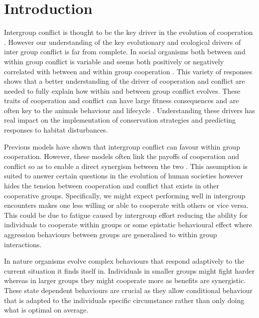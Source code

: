 \section{Introduction}

Intergroup conflict is thought to be the key driver in the evolution of cooperation \citep{radfordWithingroupBehavioural2016,kappelerMindGap2010,barkerWithingroupCompetition2012}. 
However our understanding of the key evolutionary and ecological drivers of inter group conflict is far from complete. 
In social organisms both between and within group conflict is variable and seems both positively or negatively correlated with between and within group cooperation \citep{radfordWithingroupBehavioural2016}. 
This variety of responses shows that a better understanding of the driver of cooperation and conflict are needed to fully explain how within and between group conflict evolves. 
These traits of cooperation and conflict can have large fitness consequences and are often key to the animals behaviour and lifecycle \citep{thompsonCausesConsequences2017,vitikainenLiveLong2019}. Understanding these drivers has real impact on the implementation of conservation strategies and predicting responses to habitat disturbances. 

Previous models have shown that intergroup conflict can favour within group cooperation. 
However, these models often link the payoffs of cooperation and conflict so as to enable a direct synergism between the two \citep{choiCoevolutionParochial2007,lehmannWarEvolution2008a}. 
This assumption is suited to answer certain questions in the evolution of human societies however hides the tension between cooperation and conflict that exists in other cooperative groups. 
Specifically, we might expect performing well in intergroup encounters makes one less willing or able to cooperate with others or vice versa. 
This could be due to fatigue caused by intergroup effort reducing the ability for individuals to cooperate within groups or some epistatic behavioural effect where aggression behaviours between groups are generalised to within group interactions.

In nature organisms evolve complex behaviours that respond adaptively to the current situation it finds itself in. Individuals in smaller groups might fight harder whereas in larger groups they might cooperate more as benefits are synergistic. 
These state dependent behaviours are crucial as they allow conditional behaviour that is adapted to the individuals specific circumstance rather than only doing what is optimal on average. 

